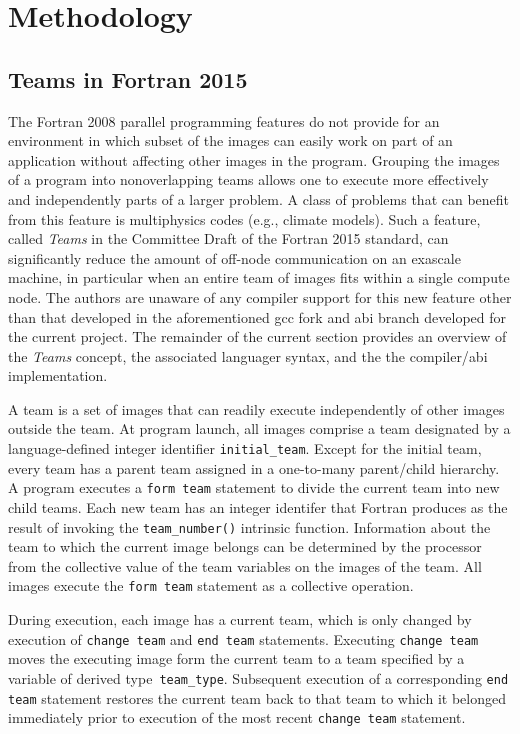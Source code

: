 \section{Methodology}\label{sec:methodology}
\subsection{Teams in Fortran 2015}\label{teams-in-fortran-2015}
The Fortran 2008 parallel programming features do not provide for an environment in which
subset of the images can easily work on part of an application without affecting
other images in the program.  Grouping the images of a program into nonoverlapping
teams allows one to execute more effectively and independently parts of a larger
problem.  A class of problems that can benefit from this feature is multiphysics codes
(e.g.,  climate models).
Such a feature, called \textit{Teams} in the Committee Draft of the Fortran 2015 standard, can significantly
reduce the amount of off-node communication on an exascale machine, in particular when an entire team of images
fits within a single compute node.
The authors are unaware of any compiler support for this new feature other than that developed in the aforementioned
\gls{gcc} fork and \gls{abi} branch developed for the current project.  The remainder of the current section
provides an overview of the \textit{Teams} concept, the associated languager syntax, and the the compiler/\gls{abi}
implementation.

A team is a set of images that can readily execute independently of other images outside the team.
At program launch, all images comprise a team designated by a language-defined integer identifier \texttt{initial\_team}.
Except for the initial team, every team has a parent team assigned in a one-to-many parent/child hierarchy.
A program executes a \texttt{form team} statement to divide the current team into new child teams.
Each new team has an integer identifer that Fortran produces as the result of invoking the \texttt{team\_number()}
intrinsic function.  Information about the team to which the current image belongs can be determined by the
processor from the collective value of the team variables on the images of the team.
All images execute the \texttt{form team} statement as a collective operation.

During execution, each image has a current team, which is only changed by execution of \texttt{change team} and
\texttt{end team} statements. Executing \texttt{change team} moves the executing image form the current team to a team
specified by a variable of derived type~\texttt{team\_type}.  Subsequent execution of a corresponding \texttt{end team}
statement restores the current team back to that team to which it belonged immediately prior to execution of the most
recent \texttt{change team} statement.

